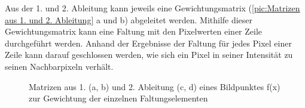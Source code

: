 \documentclass[ngerman,12pt]{article} %
\begin{document}
Aus der 1. und 2. Ableitung kann jeweils eine Gewichtungsmatrix (\autoref{pic:Matrizen aus 1. und 2. Ableitung} a und b) abgeleitet werden. Mithilfe dieser Gewichtungsmatrix kann eine Faltung mit den Pixelwerten einer Zeile durchgeführt werden. Anhand der Ergebnisse der Faltung für jedes Pixel einer Zeile kann darauf geschlossen werden, wie sich ein Pixel in seiner Intensität zu seinen Nachbarpixeln verhält.

\begin{figure}[h!tb]
  \centering
  \qquad
  \qquad
  \qquad
  \caption[Matrizen aus 1. und 2. Ableitung eines Bildpunktes f(x) ]{\label{pic:Matrizen aus 1. und 2. Ableitung}Matrizen aus 1. (a, b) und 2. Ableitung (c, d) eines Bildpunktes f(x) zur Gewichtung der einzelnen Faltungselementen}
\end{figure}
\end{document}
